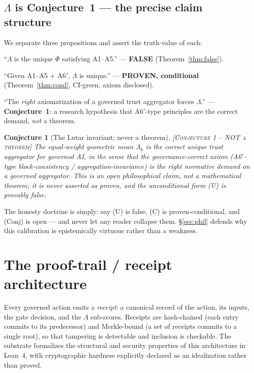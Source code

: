 \documentclass[11pt]{article}
\theoremstyle{plain}
\newtheorem{conjecture}{Conjecture}
\theoremstyle{definition}
\theoremstyle{remark}
\newcommand{\statusConj}{\textcolor{red!70!black}{\textsc{[Conjecture 1 -- NOT a theorem]}}}
\newcommand{\La}{\Lambda}
\begin{document}
\subsection{$\La$ is Conjecture~1 --- the precise claim structure}
\label{sec:conj}
We separate three propositions and assert the truth-value of each:
\begin{description}[leftmargin=2.4em,itemsep=2pt]
  \item[(U) Unconditional uniqueness] ``$\La$ is the unique $\Phi$ satisfying
    A1--A5.'' --- \textbf{FALSE} (Theorem~\ref{thm:false}).
  \item[(C) Conditional uniqueness] ``Given A1--A5 + A6$'$, $\La$ is unique.''
    --- \textbf{PROVEN, conditional} (Theorem~\ref{thm:cond}, CI-green, axiom disclosed).
  \item[(Conj) The governance conjecture] ``The \emph{right} axiomatization of a
    governed trust aggregator forces $\La$.'' --- \textbf{Conjecture~1}: a research
    hypothesis that A6$'$-type principles are the correct demand, \emph{not} a theorem.
\end{description}

\begin{conjecture}[The Lutar invariant; never a theorem]
\label{conj:lambda}
\statusConj\;
The equal-weight geometric mean $\La_k$ is the correct unique trust aggregator for
governed AI, in the sense that the governance-correct axiom (A6$'$-type
block-consistency / aggregation-invariance) is the right normative demand on a
governed aggregator. This is an open philosophical claim, not a mathematical
theorem; it is \emph{never} asserted as proven, and the unconditional form (U) is
\emph{provably false}.
\end{conjecture}

The honesty doctrine is simply: say (U) is false, (C) is proven-conditional, and
(Conj) is open --- and never let any reader collapse them. \S\ref{sec:phil} defends
why this calibration is epistemically virtuous rather than a weakness.

\section{The proof-trail / receipt architecture}
\label{sec:receipts}

Every governed action emits a \emph{receipt}: a canonical record of the action, its
inputs, the gate decision, and the $\La$ sub-scores. Receipts are hash-chained
(each entry commits to its predecessor) and Merkle-bound (a set of receipts commits
to a single root), so that tampering is detectable and inclusion is checkable. The
substrate formalizes the structural and security properties of this architecture in
Lean~4, with cryptographic hardness explicitly declared as an idealization rather
than proved.
\end{document}
